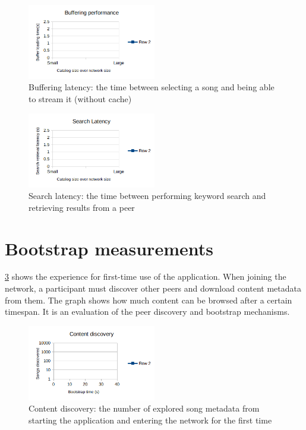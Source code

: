\begin{figure}
    \centering
    \includegraphics[width=0.5\textwidth]{experiments/buffering-performance.png}
    \caption{Buffering latency: the time between selecting a song and being able to stream it (without cache)}
    \label{fig:buffering-performance}
\end{figure}

\begin{figure}
    \centering
    \includegraphics[width=0.5\textwidth]{experiments/search-latency.png}
    \caption{Search latency: the time between performing keyword search and retrieving results from a peer}
    \label{fig:search-latency}
\end{figure}

\section{Bootstrap measurements}
\ref{fig:content-discovery} shows the experience for first-time use of the application. When joining the network, a participant must discover other peers and download content metadata from them. The graph shows how much content can be browsed after a certain timespan. It is an evaluation of the peer discovery and bootstrap mechanisms.

\begin{figure}
    \centering
    \includegraphics[width=0.5\textwidth]{experiments/content-discovery.png}
    \caption{Content discovery: the number of explored song metadata from starting the application and entering the network for the first time}
    \label{fig:content-discovery}
\end{figure}

